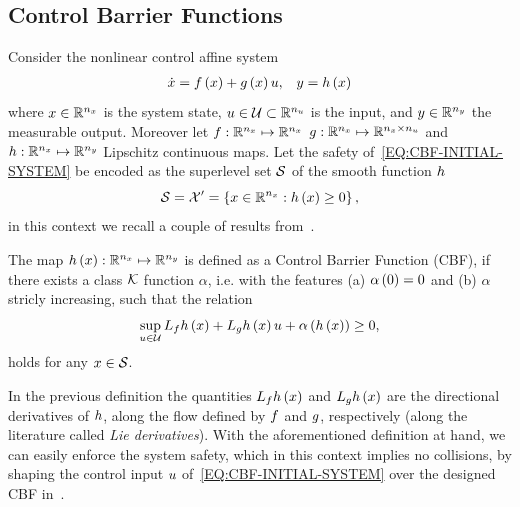 \subsection{Control Barrier Functions}%
\label{SEC:CONTROL-BARRIER-FUNCTION}
Consider the nonlinear control affine system
\begin{equation}%
    \label{EQ:CBF-INITIAL-SYSTEM}
    \begin{matrix}
        \dot{\xx} = \xfun \lp \xx \rp + \ufun \lp \xx \rp \uu, & \yy = \yfun \lp \xx \rp
    \end{matrix}
\end{equation}
where $x \in \mathbb{R}^{n_{x}}$ is the system state, $u \in \mathcal{U} \subset \mathbb{R}^{n_{u}}$ is the input,
and $y \in \mathbb{R}^{n_{y}}$ the measurable output. Moreover let $f : \mathbb{R}^{n_{x}} \mapsto \mathbb{R}^{n_{x}}$
$g : \mathbb{R}^{n_{x}} \mapsto \mathbb{R}^{n_{x} \times n_{u}}$ and $h : \mathbb{R}^{n_{x}} \mapsto \mathbb{R}^{n_{y}}$
Lipschitz continuous maps. Let the safety of~\eqref{EQ:CBF-INITIAL-SYSTEM} be encoded as the superlevel set
$\mathcal{S}$ of the smooth function $h$
\begin{equation*}
    \mathcal{S} = \mathcal{X}' = \left \{  x \in \mathbb{R}^{n_{x}} : h \left( x \right) \ge 0 \right \},
\end{equation*}
in this context we recall a couple of results from~\cite{xiao2019control, nguyen2016exponential, ames2016control}.
\begin{definition}%
    \label{DEF:CONTROL-BARRIER-FUNCTION}
    The map $h \left( x \right) : \mathbb{R}^{n_{x}} \mapsto \mathbb{R}^{n_{y}}$ is defined as a Control Barrier Function (CBF),
    if there exists a class $\mathcal{K}$ function $\alpha$, i.e. with the features (a) $\alpha \left( 0 \right) = 0$ and (b)
    $\alpha$ stricly increasing, such that the relation
    \begin{equation*}
        \sup_{u \in \mathcal{U}} L_{f} h \left( x \right) + L_{g} h \left( x \right) u + \alpha \left( h \left( x \right)\right) \ge 0,
    \end{equation*}
    holds for any $x \in \mathcal{S}$.
\end{definition}
In the previous definition the quantities $L_{f} h \left( x \right)$ and $L_{g} h \left( x \right)$ are the directional derivatives
of $h$, along the flow defined by $f$ and $g$, respectively (along the literature called \emph{Lie derivatives}).
With the aforementioned definition at hand, we can easily enforce the system safety, which in this context implies no collisions,
by shaping the control input $u$ of~\eqref{EQ:CBF-INITIAL-SYSTEM} over the designed CBF in~.
